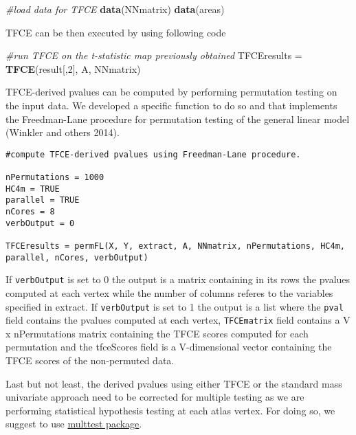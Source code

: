 \documentclass[]{article}
\newenvironment{Shaded}{\begin{snugshade}}{\end{snugshade}}
\newcommand{\KeywordTok}[1]{\textcolor[rgb]{0.13,0.29,0.53}{\textbf{{#1}}}}
\newcommand{\DecValTok}[1]{\textcolor[rgb]{0.00,0.00,0.81}{{#1}}}
\newcommand{\StringTok}[1]{\textcolor[rgb]{0.31,0.60,0.02}{{#1}}}
\newcommand{\CommentTok}[1]{\textcolor[rgb]{0.56,0.35,0.01}{\textit{{#1}}}}
\newcommand{\NormalTok}[1]{{#1}}
\begin{document}
\begin{Shaded}
\begin{Highlighting}[]
\CommentTok{#load data for TFCE}
\KeywordTok{data}\NormalTok{(NNmatrix)}
\KeywordTok{data}\NormalTok{(areas)}
\end{Highlighting}
\end{Shaded}

TFCE can be then executed by using following code

\begin{Shaded}
\begin{Highlighting}[]
\CommentTok{#run TFCE on the t-statistic map previously obtained}
\NormalTok{TFCEresults =}\StringTok{ }\KeywordTok{TFCE}\NormalTok{(result[,}\DecValTok{2}\NormalTok{], A, NNmatrix)}
\end{Highlighting}
\end{Shaded}

TFCE-derived pvalues can be computed by performing permutation testing
on the input data. We developed a specific function to do so and that
implements the Freedman-Lane procedure for permutation testing of the
general linear model (Winkler and others 2014).

\begin{verbatim}
#compute TFCE-derived pvalues using Freedman-Lane procedure.

nPermutations = 1000
HC4m = TRUE
parallel = TRUE
nCores = 8
verbOutput = 0

TFCEresults = permFL(X, Y, extract, A, NNmatrix, nPermutations, HC4m, parallel, nCores, verbOutput)
\end{verbatim}

If \texttt{verbOutput} is set to 0 the output is a matrix containing in
its rows the pvalues computed at each vertex while the number of columns
referes to the variables specified in extract. If \texttt{verbOutput} is
set to 1 the output is a list where the \texttt{pval} field contains the
pvalues computed at each vertex, \texttt{TFCEmatrix} field contains a V
x nPermutations matrix containing the TFCE scores computed for each
permutation and the tfceScores field is a V-dimensional vector
containing the TFCE scores of the non-permuted data.

Last but not least, the derived pvalues using either TFCE or the
standard mass univariate approach need to be corrected for multiple
testing as we are performing statistical hypothesis testing at each
atlas vertex. For doing so, we suggest to use
\href{http://bioconductor.org/packages/release/bioc/html/multtest.html}{multtest
package}.
\end{document}
